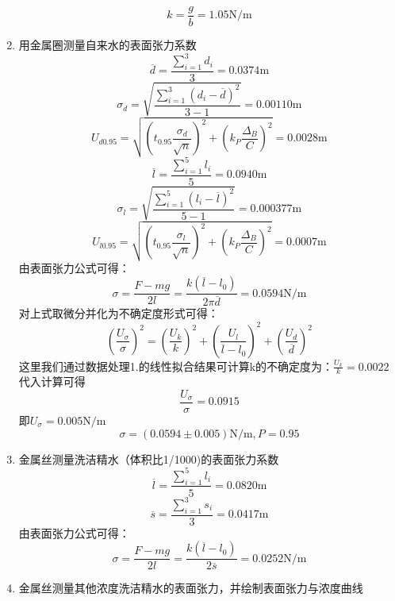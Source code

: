 \documentclass[12pt]{ustcreport}
\begin{document}
\begin{enumerate}
\begin{equation*}
        k = \frac{g}{b} = 1.05 \mathrm{N}/\mathrm{m}
    \end{equation*}
    \item 用金属圈测量自来水的表面张力系数
    \begin{equation*}
        \overline{d} = \frac{\sum_{i=1}^3d_i}{3} = 0.0374\mathrm{m}
    \end{equation*}
    \[
        \sigma_d = \sqrt{\frac{\sum_{i = 1}^3\left(d_i-\overline{d}\right)^2 }{3-1}} = 0.00110 \mathrm{m}
        \]
        \[
            U_{d 0.95}=\sqrt{\left(t_{0.95} \frac{\sigma_{d}}{\sqrt{n}}\right)^{2}+\left(k_{P} \frac{\Delta_{B}}{C}\right)^{2}} = 0.0028\mathrm{m}
        \]
        \begin{equation*}
            \overline{l} = \frac{\sum_{i=1}^5l_i}{5} = 0.0940\mathrm{m}
        \end{equation*}
        \[
            \sigma_l = \sqrt{\frac{\sum_{i = 1}^5\left(l_i-\overline{l}\right)^2 }{5-1}} = 0.000377\mathrm{m}
            \]
            \[
                U_{l 0.95}=\sqrt{\left(t_{0.95} \frac{\sigma_{l}}{\sqrt{n}}\right)^{2}+\left(k_{P} \frac{\Delta_{B}}{C}\right)^{2}} = 0.0007\mathrm{m}
            \]
            由表面张力公式可得：
            \begin{equation*}
                \sigma = \frac{F-mg}{2l} = \frac{k(\overline{l}-l_0)}{2\pi\overline{d}} = 0.0594 \mathrm{N} /\mathrm{m}
            \end{equation*}
            对上式取微分并化为不确定度形式可得：
            \begin{equation*}
                \left(\frac{U_{\sigma}}{\sigma}\right)^{2}=\left(\frac{U_{k}}{k}\right)^{2}+\left(\frac{U_{l}}{\overline{l}-l_{0}}\right)^{2}+\left(\frac{U_{d}}{\overline{d}}\right)^{2}
            \end{equation*}
            这里我们通过数据处理1.的线性拟合结果可计算k的不确定度为：$\frac{U_{k}}{k} = 0.0022$
            代入计算可得
            \begin{equation*}
                \frac{U_{\sigma}}{\sigma} = 0.0915
            \end{equation*}
            即$U_\sigma = 0.005 \mathrm{N}/\mathrm{m}$
            \[
                \sigma = (0.0594 \pm 0.005) \mathrm{N}/\mathrm{m},P=0.95\]
    \item 金属丝测量洗洁精水（体积比1/1000)的表面张力系数
    \begin{equation*}
        \overline{l} = \frac{\sum_{i=1}^5l_i}{5} = 0.0820\mathrm{m}
    \end{equation*}
    \begin{equation*}
        \overline{s} = \frac{\sum_{i=1}^3s_i}{3} = 0.0417\mathrm{m}
    \end{equation*}
    由表面张力公式可得：
            \begin{equation*}
                \sigma = \frac{F-mg}{2l} = \frac{k(\overline{l}-l_0)}{2\overline{s}} = 0.0252 \mathrm{N} /\mathrm{m}
            \end{equation*}
    \item 金属丝测量其他浓度洗洁精水的表面张力，并绘制表面张力与浓度曲线
    

\end{enumerate}
\end{document}
